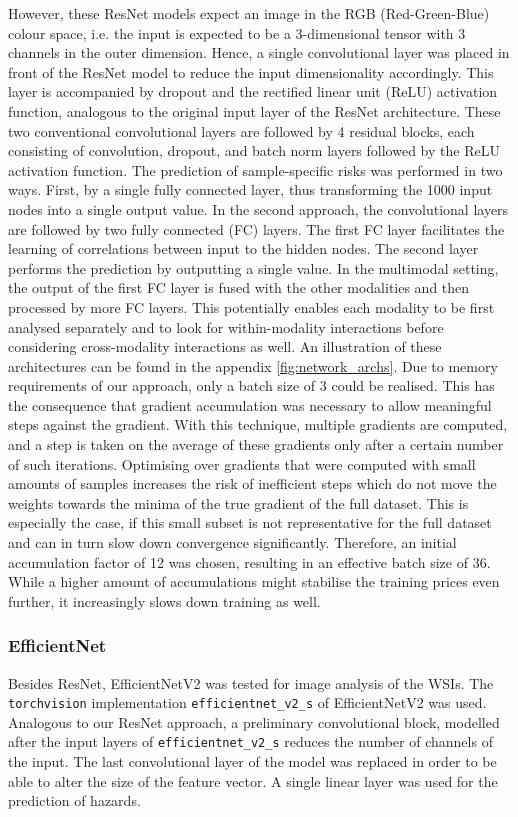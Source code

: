However, these ResNet models expect an image in the RGB (Red-Green-Blue) colour space, i.e. the input is expected to be a 3-dimensional tensor with 3 channels in the outer dimension. Hence, a single convolutional layer was placed in front of the ResNet model to reduce the input dimensionality accordingly. This layer is accompanied by dropout and the rectified linear unit (ReLU) activation function, analogous to the original input layer of the ResNet architecture. 
These two conventional convolutional layers are followed by 4 residual blocks, each consisting of convolution, dropout, and batch norm layers followed by the ReLU activation function. The prediction of sample-specific risks was performed in two ways. First, by a single fully connected layer, thus transforming the 1000 input nodes into a single output value. In the second approach, the convolutional layers are followed by two fully connected (FC) layers. The first FC layer facilitates the learning of correlations between input to the hidden nodes. The second layer performs the prediction by outputting a single value. In the multimodal setting, the output of the first FC layer is fused with the other modalities and then processed by more FC layers. This potentially enables each modality to be first analysed separately and to look for within-modality interactions before considering cross-modality interactions as well. An illustration of these architectures can be found in the appendix \ref{fig:network_archs}. 
Due to memory requirements of our approach, only a batch size of 3 could be realised. This has the consequence that gradient accumulation was necessary to allow meaningful steps against the gradient. With this technique, multiple gradients are computed, and a step is taken on the average of these gradients only after a certain number of such iterations. Optimising over gradients that were computed with small amounts of samples increases the risk of inefficient steps which do not move the weights towards the minima of the true gradient of the full dataset. This is especially the case, if this small subset is not representative for the full dataset and can in turn slow down convergence significantly. Therefore, an initial accumulation factor of 12 was chosen, resulting in an effective batch size of 36. While a higher amount of accumulations might stabilise the training prices even further, it increasingly slows down training as well.
\subsubsection{EfficientNet} 
Besides ResNet, EfficientNetV2 was tested for image analysis of the WSIs. The \verb|torchvision| implementation \verb|efficientnet_v2_s| of EfficientNetV2 was used. Analogous to our ResNet approach, a preliminary convolutional block, modelled after the input layers of \verb|efficientnet_v2_s| reduces the number of channels of the input. 
The last convolutional layer of the model was replaced in order to be able to alter the size of the feature vector. A single linear layer was used for the prediction of hazards.
